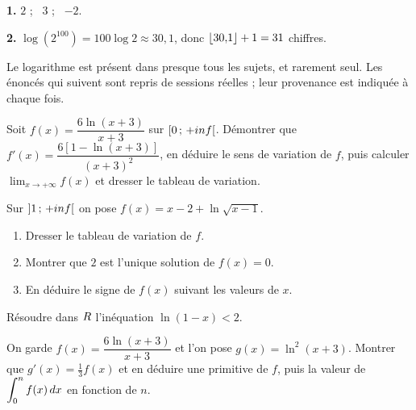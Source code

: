 \begin{corrige}
\textbf{1.} $2$ ; \ $3$ ; \ $-2$.

\textbf{2.} $\log\left(2^{100}\right) = 100\log 2 \approx 30{,}1$, donc
$\left\lfloor 30{,}1 \right\rfloor+1 = 31$ chiffres.
\end{corrige}

\begin{annales}
Le logarithme est présent dans presque tous les sujets, et rarement seul. Les
énoncés qui suivent sont repris de sessions réelles ; leur provenance est
indiquée à chaque fois.

Soit $f(x) = \dfrac{6\ln(x+3)}{x+3}$ sur $\left[0\,;\,+inf\right[$.
Démontrer que $f'(x) = \dfrac{6\left[1-\ln(x+3)\right]}{(x+3)^{2}}$, en
déduire le sens de variation de $f$, puis calculer
$\lim_{x\to+\infty}f(x)$ et dresser le tableau de variation.

Sur $\left]1\,;\,+inf\right[$ on pose $f(x) = x-2+\ln\sqrt{x-1}$.
\begin{enumerate}[label=\textbf{\alph*)}, leftmargin=*, itemsep=0.15em]
  \item Dresser le tableau de variation de $f$.
  \item Montrer que $2$ est l'unique solution de $f(x) = 0$.
  \item En déduire le signe de $f(x)$ suivant les valeurs de $x$.
\end{enumerate}

Résoudre dans $R$ l'inéquation $\ln(1-x) < 2$.

On garde $f(x) = \dfrac{6\ln(x+3)}{x+3}$ et l'on pose
$g(x) = \ln^{2}(x+3)$. Montrer que $g'(x) = \frac13 f(x)$ et en déduire une
primitive de $f$, puis la valeur de
$\displaystyle\int_{0}^{n}f(x)\,dx$ en fonction de $n$.


\end{annales}

